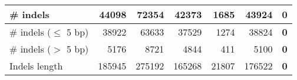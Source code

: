 \documentclass[12pt,a4paper]{article}
\begin{document}
\begin{table}[ht]
\begin{center}
\begin{tabular}{|l*{6}{|r}|}
\# indels & 44098 & 72354 & 42373 & 1685 & 43924 & {\bf 0} \\ \hline
\hspace{5mm}\# indels ($\leq$ 5 bp) & 38922 & 63633 & 37529 & 1274 & 38824 & {\bf 0} \\ \hline
\hspace{5mm}\# indels ($>$ 5 bp) & 5176 & 8721 & 4844 & 411 & 5100 & {\bf 0} \\ \hline
Indels length & 185945 & 275192 & 165268 & 21807 & 176522 & {\bf 0} \\ \hline
\end{tabular}
\end{center}
\end{table}
\end{document}
